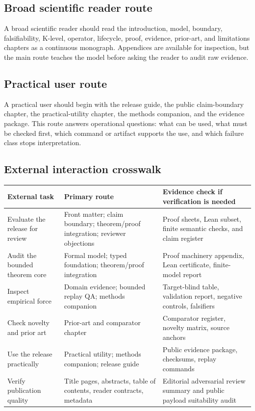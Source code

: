 \subsection{Broad scientific reader route}

A broad scientific reader should read the introduction, model, boundary,
falsifiability, K-level, operator, lifecycle, proof, evidence, prior-art, and
limitations chapters as a continuous monograph. Appendices are available for
inspection, but the main route teaches the model before asking the reader to
audit raw evidence.

\subsection{Practical user route}

A practical user should begin with the release guide, the public claim-boundary
chapter, the practical-utility chapter, the methods companion, and the evidence
package. This route answers operational questions: what can be used, what must
be checked first, which command or artifact supports the use, and which failure
class stops interpretation.

\subsection{External interaction crosswalk}

\begin{longtable}{p{}p{}p{}}
\textbf{External task} & \textbf{Primary route} & \textbf{Evidence check if verification is needed} \\
\hline
Evaluate the release for review & Front matter; claim boundary; theorem/proof integration; reviewer objections & Proof sheets, Lean subset, finite semantic checks, and claim register \\
Audit the bounded theorem core & Formal model; typed foundation; theorem/proof integration & Proof machinery appendix, Lean certificate, finite-model report \\
Inspect empirical force & Domain evidence; bounded replay QA; methods companion & Target-blind table, validation report, negative controls, falsifiers \\
Check novelty and prior art & Prior-art and comparator chapter & Comparator register, novelty matrix, source anchors \\
Use the release practically & Practical utility; methods companion; release guide & Public evidence package, checksums, replay commands \\
Verify publication quality & Title pages, abstracts, table of contents, reader contracts, metadata & Editorial adversarial review summary and public payload suitability audit \\
\end{longtable}

